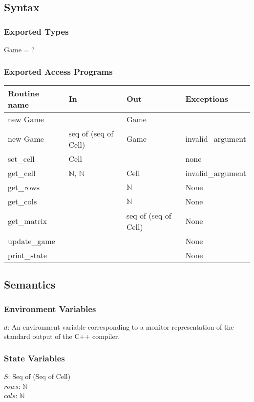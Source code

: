 \documentclass[]{article}
\begin{document}
\subsection*{Syntax}
\subsubsection*{Exported Types}
Game = ?
\subsubsection*{Exported Access Programs}
\begin{tabular}{| l | l | l | p{5cm} |}
\hline
\textbf{Routine name} & \textbf{In} & \textbf{Out} & \textbf{Exceptions}\\
\hline
new Game &  & Game & \\
\hline
new Game & seq of (seq of Cell) & Game & invalid\_argument\\ 
\hline
set\_cell & Cell &  & none\\
\hline
get\_cell &$\mathbb{N}$, $\mathbb{N}$ & Cell &  invalid\_argument\\
\hline
get\_rows & & $\mathbb{N}$ & None\\
\hline
get\_cols & & $\mathbb{N}$ & None\\
\hline
get\_matrix & & seq of (seq of Cell) & None\\
\hline
update\_game & & & None\\
\hline
print\_state & & & None\\
\hline

\end{tabular}

\subsection*{Semantics}
\subsubsection*{Environment Variables}
$d$: An environment variable corresponding to a monitor representation of the standard output
of the C++ compiler.
\subsubsection*{State Variables}
$S$: Seq of (Seq of Cell) \\
$rows$: $\mathbb{N}$ \\
$cols$: $\mathbb{N}$ \\
\end{document}
